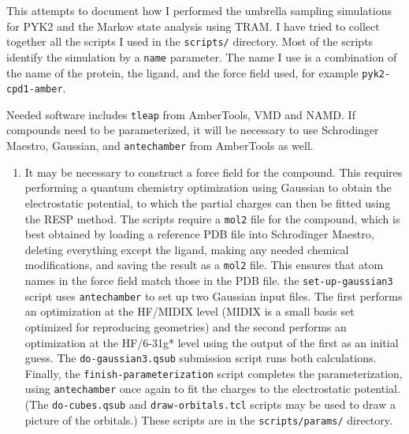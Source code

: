 \documentclass{article}      %
\begin{document}
This attempts to document how I performed the umbrella sampling simulations for PYK2 and the Markov state analysis using TRAM.  I have tried to collect together all the scripts I used in the \verb+scripts/+ directory.  Most of the scripts identify the simulation by a \verb+name+ parameter.  The name I use is a combination of the name of the protein, the ligand, and the force field used, for example \verb+pyk2-cpd1-amber+.   

Needed software includes \verb+tleap+ from AmberTools, VMD and NAMD.  If compounds need to be parameterized, it will be necessary to use Schrodinger Maestro, Gaussian, and \verb+antechamber+ from AmberTools as well.

\begin{enumerate}

\item It may be necessary to construct a force field for the compound.  This requires performing a quantum chemistry optimization using Gaussian to obtain the electrostatic potential, to which the partial charges can then be fitted using the RESP method.  The scripts require a \verb+mol2+ file for the compound, which is best obtained by loading a reference PDB file into Schrodinger Maestro, deleting everything except the ligand, making any needed chemical modifications, and saving the result as a \verb+mol2+ file.  This ensures that atom names in the force field match those in the PDB file.  the \verb+set-up-gaussian3+ script uses \verb+antechamber+ to set up two Gaussian input files.  The first performs an optimization at the HF/MIDIX level (MIDIX is a small basis set optimized for reproducing geometries) and the second performs an optimization at the HF/6-31g* level using the output of the first as an initial guess.  The \verb+do-gaussian3.qsub+ submission script runs both calculations.  Finally, the \verb+finish-parameterization+ script completes the parameterization, using \verb+antechamber+ once again to fit the charges to the electrostatic potential.  (The \verb+do-cubes.qsub+ and \verb+draw-orbitals.tcl+ scripts may be used to draw a picture of the orbitals.) These scripts are in the \verb+scripts/params/+ directory.


\end{enumerate}
\end{document}
